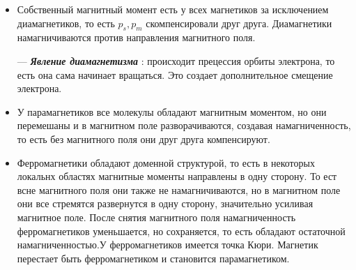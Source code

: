 \documentclass[../main.tex]{subfiles}
\begin{document}
\begin{itemize}
    \item Собственный магнитный момент есть у всех магнетиков за исключением диамагнетиков, то есть $p_s, p_m$ скомпенсировали друг друга. Диамагнетики намагничиваются против направления магнитного поля.

    --- \textit{\textbf{Явление диамагнетизма}} : происходит прецессия орбиты электрона, то есть она сама начинает вращаться. Это создает дополнительное смещение электрона.

    \item  У парамагнетиков все молекулы обладают магнитным моментом, но они перемешаны и в магнитном поле разворачиваются,
    создавая намагниченность, то есть без магнитного поля они друг друга компенсируют.

    \item Ферромагнетики обладают доменной структурой, то есть в некоторых локальнх областях магнитные моменты направлены в одну сторону. То ест всне магнитного поля они также 
    не намагничиваются, но в магнитном поле они все стремятся развернутся в одну сторону, значительно усиливая магнитное поле.
    После снятия магнитного поля намагниченность ферромагнетиков уменьшается, но сохраняется, то есть обладают остаточной намагниченностью.У ферромагнетиков имеется точка Кюри. Магнетик 
    перестает быть ферромагнетиком и становится парамагнетиком.
    \begin{center}


\end{center}
\end{itemize}
\end{document}
